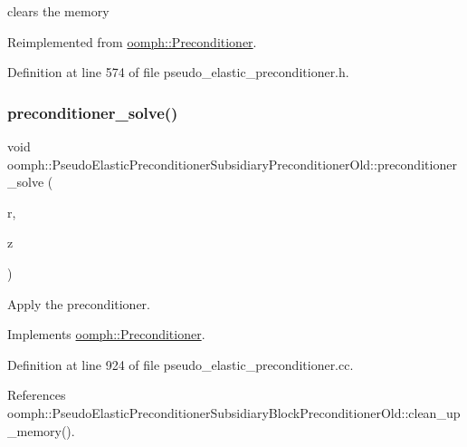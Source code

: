 clears the memory 



Reimplemented from \hyperlink{classoomph_1_1Preconditioner_a46c31c416829bedcd9db238431262027}{oomph\+::\+Preconditioner}.



Definition at line 574 of file pseudo\+\_\+elastic\+\_\+preconditioner.\+h.

\mbox{\label{classoomph_1_1PseudoElasticPreconditionerSubsidiaryPreconditionerOld_a01d70c9e3454b52c86f4439d29fd4b22}} 
\subsubsection{\texorpdfstring{preconditioner\+\_\+solve()}{preconditioner\_solve()}}
{\footnotesize\ttfamily void oomph\+::\+Pseudo\+Elastic\+Preconditioner\+Subsidiary\+Preconditioner\+Old\+::preconditioner\+\_\+solve (\begin{DoxyParamCaption}\item[{const \hyperlink{classoomph_1_1DoubleVector}{Double\+Vector} \&}]{r,  }\item[{\hyperlink{classoomph_1_1DoubleVector}{Double\+Vector} \&}]{z }\end{DoxyParamCaption})\hspace{0.3cm}{\ttfamily [virtual]}}



Apply the preconditioner. 



Implements \hyperlink{classoomph_1_1Preconditioner_ace1199369e4465cd2b9a34884bb64ec8}{oomph\+::\+Preconditioner}.



Definition at line 924 of file pseudo\+\_\+elastic\+\_\+preconditioner.\+cc.



References oomph\+::\+Pseudo\+Elastic\+Preconditioner\+Subsidiary\+Block\+Preconditioner\+Old\+::clean\+\_\+up\+\_\+memory().



